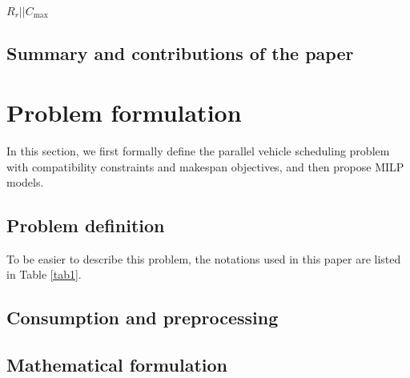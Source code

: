 \documentclass[preprint,12pt,authoryear]{elsarticle}
\begin{document}
$R_r||C_{\max}$                                                                                                                                                      

\subsection{Summary and contributions of the paper}

\section{Problem formulation}

In this section, we first formally define the parallel vehicle scheduling problem 
with compatibility constraints and makespan objectives, 
and then propose MILP models.

\subsection{Problem definition}

To be easier to describe this problem, the notations used in this paper are listed in Table \ref{tab1}.

\subsection{Consumption and preprocessing}

\subsection{Mathematical formulation}
\end{document}
